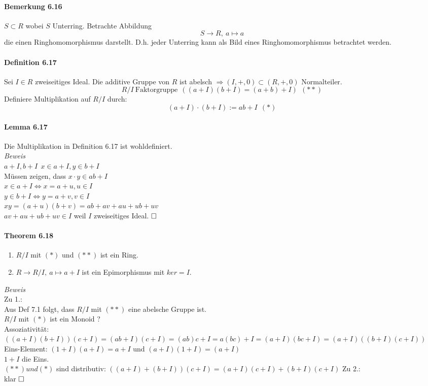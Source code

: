 \documentclass{scrartcl}
\begin{document}
\paragraph{Bemerkung 6.16}
$S \subset R$ wobei $S$ Unterring. Betrachte Abbildung
\[
  S \to R,~a \mapsto a
\]
die einen Ringhomomorphismus darstellt. D.h. jeder Unterring kann als Bild eines
Ringhomomorphismus betrachtet werden.

\paragraph{Definition 6.17}
Sei $I \in R$ zweiseitiges Ideal. Die additive Gruppe von $R$ ist abelsch
$\Rightarrow (I, +, 0) \subset (R, +, 0)$ Normalteiler.
\[
  R/I ~\text{Faktorgruppe}~~((a+I)(b+I) = (a+b) + I) ~~(**)
\]
Definiere Multiplikation auf $R/I$ durch:
\[
  (a + I) \cdot (b + I) := ab + I ~~(*)
\]

\paragraph{Lemma 6.17}
Die Multiplikation in Definition 6.17 ist wohldefiniert. \\
\textit{Beweis} \\
$a + I, b + I~~ x \in a + I, y \in b + I$ \\
Müssen zeigen, dass $x \cdot y \in ab + I$ \\
$x \in a + I \Leftrightarrow x = a + u, u \in I $ \\
$y \in b + I \Leftrightarrow y = a + v, v \in I $ \\
$xy = (a + u)(b + v) = ab + av + au + ub + uv$ \\
$av + au + ub + uv \in I$ weil $I$ zweiseitiges Ideal.
$\hfill \square$

\paragraph{Theorem 6.18}
\begin{enumerate}
\item $R/I$ mit $(*)$ und $(**)$ ist ein Ring.
\item $R \to R/I,~a \mapsto a + I$ ist ein Epimorphismus mit $ker = I$.
\end{enumerate}
\textit{Beweis} \\
Zu 1.: \\
Aus Def 7.1 folgt, dass $R/I$ mit $(**)$ eine abelsche Gruppe ist. \\
$R/I$ mit $(*)$ ist ein Monoid ? \\
Assoziativität: $((a + I)(b + I))(c + I) = (ab + I)(c + I) = (ab)c + I = a(bc) +
I = (a + I)(bc + I) = (a + I)((b + I)(c + I))$ \\
Eins-Element: $(1 + I)(a + I) = a + I$ und $(a + I)(1 + I) = (a + I)$ \\
$1 + I$ die Eins. \\
$(**) und (*)$ sind distributiv: $((a + I) + (b + I))( c+ I) = (a + I)(c+ I) +
(b + I)(c + I)$
Zu 2.: \\
klar
$\hfill \square$
\end{document}
